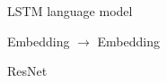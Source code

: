 \documentclass[11pt]{article}
\begin{document}
\begin{subsection}{LSTM language model}




\end{subsection}


\begin{subsection}{Embedding $\rightarrow$ Embedding}



\end{subsection}





\begin{subsection}{ResNet}



\end{subsection}






%
%
%
%
%
\end{document}

